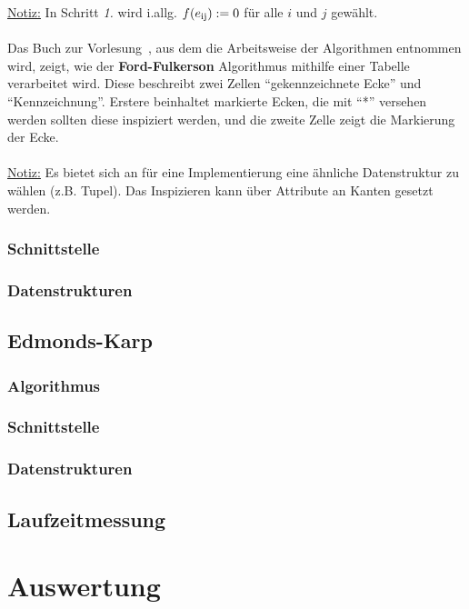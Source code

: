\documentclass[11pt]{article}
\begin{document}
    \underline{Notiz:} In Schritt \textit{1.} wird i.allg. $f(e\textsubscript{ij}) := 0$ f\"ur alle $i$ und $j$ gew\"ahlt.\\~\\
    Das Buch zur Vorlesung~\cite{grbuch}, aus dem die Arbeitsweise der Algorithmen entnommen wird, zeigt, wie der \textbf{Ford-Fulkerson} Algorithmus mithilfe einer Tabelle verarbeitet wird. Diese beschreibt zwei Zellen "`gekennzeichnete Ecke"' und "`Kennzeichnung"'. Erstere beinhaltet markierte Ecken, die mit "`*"' versehen werden sollten diese inspiziert werden, und die zweite Zelle zeigt die Markierung der Ecke.\\~\\
    \underline{Notiz:} Es bietet sich an f\"ur eine Implementierung eine \"ahnliche Datenstruktur zu w\"ahlen (z.B. Tupel). Das Inspizieren kann \"uber Attribute an Kanten gesetzt werden.
    \subsubsection{Schnittstelle}
    \subsubsection{Datenstrukturen}

    \subsection{Edmonds-Karp}
    \subsubsection{Algorithmus}
    \subsubsection{Schnittstelle}
    \subsubsection{Datenstrukturen}

    \subsection{Laufzeitmessung}

    \section{Auswertung}
\end{document}
